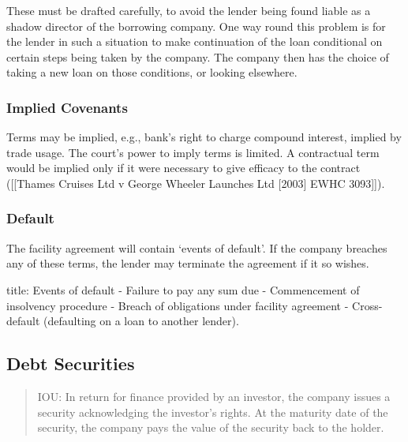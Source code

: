 \documentclass[
]{article}
\newenvironment{Shaded}{}{}
\newcommand{\NormalTok}[1]{#1}
\begin{document}
These must be drafted carefully, to avoid the lender being found liable
as a shadow director of the borrowing company. One way round this
problem is for the lender in such a situation to make continuation of
the loan conditional on certain steps being taken by the company. The
company then has the choice of taking a new loan on those conditions, or
looking elsewhere.

\hypertarget{implied-covenants}{%
\subsubsection{Implied Covenants}\label{implied-covenants}}

Terms may be implied, e.g., bank's right to charge compound interest,
implied by trade usage. The court's power to imply terms is limited. A
contractual term would be implied only if it were necessary to give
efficacy to the contract ({[}{[}Thames Cruises Ltd v George Wheeler
Launches Ltd {[}2003{]} EWHC 3093{]}{]}).

\hypertarget{default}{%
\subsubsection{Default}\label{default}}

The facility agreement will contain `events of default'. If the company
breaches any of these terms, the lender may terminate the agreement if
it so wishes.

\begin{Shaded}
\begin{Highlighting}[]
\NormalTok{title: Events of default}
\NormalTok{{-} Failure to pay any sum due}
\NormalTok{{-} Commencement of insolvency procedure}
\NormalTok{{-} Breach of obligations under facility agreement }
\NormalTok{{-} Cross{-}default (defaulting on a loan to another lender). }
\end{Highlighting}
\end{Shaded}

\hypertarget{debt-securities}{%
\subsection{Debt Securities}\label{debt-securities}}

\begin{quote}
IOU: In return for finance provided by an investor, the company issues a
security acknowledging the investor's rights. At the maturity date of
the security, the company pays the value of the security back to the
holder.
\end{quote}
\end{document}
